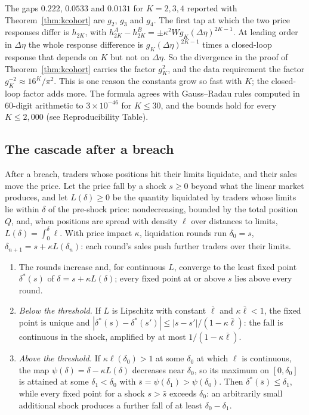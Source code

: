The gaps $0.222$, $0.0533$ and $0.0131$ for $K=2,3,4$ reported with Theorem~\ref{thm:kcohort} are $g_2$, $g_3$ and $g_4$. The first tap at which the two price responses differ is $h_{2K}$, with $h^A_{2K}-h^B_{2K}=\pm\kappa^2Wg_K(\Delta\eta)^{2K-1}$. At leading order in $\Delta\eta$ the whole response difference is $g_K(\Delta\eta)^{2K-1}$ times a closed-loop response that depends on $K$ but not on $\Delta\eta$. So the divergence in the proof of Theorem~\ref{thm:kcohort} carries the factor $g_K^2$, and the data requirement the factor $g_K^{-2}\approx16^K/\pi^2$. This is one reason the constants grow so fast with $K$; the closed-loop factor adds more. The formula agrees with Gauss--Radau rules computed in 60-digit arithmetic to $3\times10^{-46}$ for $K\le30$, and the bounds hold for every $K\le2{,}000$ (see Reproducibility Table).

\subsection{The cascade after a breach}

After a breach, traders whose positions hit their limits liquidate, and their sales move the price. Let the price fall by a shock $s\ge0$ beyond what the linear market produces, and let $L(\delta)\ge0$ be the quantity liquidated by traders whose limits lie within $\delta$ of the pre-shock price: nondecreasing, bounded by the total position $Q$, and, when positions are spread with density $\ell$ over distances to limits, $L(\delta)=\int_0^\delta\ell$. With price impact $\kappa$, liquidation rounds run $\delta_0=s$, $\delta_{n+1}=s+\kappa L(\delta_n)$: each round's sales push further traders over their limits.

\begin{theorem}\label{thm:cascade}
\begin{enumerate}[label=(\roman*),itemsep=1pt]
\item The rounds increase and, for continuous $L$, converge to the least fixed point $\delta^*(s)$ of $\delta=s+\kappa L(\delta)$; every fixed point at or above $s$ lies above every round.
\item \emph{Below the threshold.} If $L$ is Lipschitz with constant $\bar\ell$ and $\kappa\bar\ell<1$, the fixed point is unique and $|\delta^*(s)-\delta^*(s')|\le|s-s'|/(1-\kappa\bar\ell)$: the fall is continuous in the shock, amplified by at most $1/(1-\kappa\bar\ell)$.
\item \emph{Above the threshold.} If $\kappa\ell(\delta_0)>1$ at some $\delta_0$ at which $\ell$ is continuous, the map $\psi(\delta)=\delta-\kappa L(\delta)$ decreases near $\delta_0$, so its maximum on $[0,\delta_0]$ is attained at some $\delta_1<\delta_0$ with $\bar s=\psi(\delta_1)>\psi(\delta_0)$. Then $\delta^*(\bar s)\le\delta_1$, while every fixed point for a shock $s>\bar s$ exceeds $\delta_0$: an arbitrarily small additional shock produces a further fall of at least $\delta_0-\delta_1$.
\end{enumerate}
\end{theorem}

